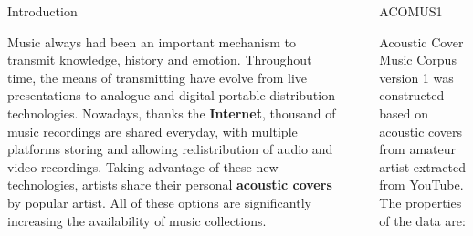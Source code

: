 \documentclass[final]{beamer}
\newlength{\sepwid}
\newlength{\onecolwid}
\newlength{\twocolwid}
\begin{document}
\begin{frame}[t]
\begin{columns}[t]
\begin{column}{\onecolwid}
\begin{block}{Introduction}

Music always had been an important mechanism to transmit knowledge, history and emotion. 
Throughout time, the means of transmitting have evolve from live presentations to analogue and digital portable distribution technologies.
Nowadays, thanks the \textbf{Internet}, thousand of music recordings are shared everyday, with multiple platforms storing and allowing redistribution of audio and video recordings.
Taking advantage of these new technologies, artists share their personal \textbf{acoustic covers} by popular artist.
All of these options are significantly increasing the availability of music collections.

\end{block}



\end{column} %

\begin{column}{\sepwid}\end{column} %

\begin{column}{\twocolwid} %

\begin{columns}[t,totalwidth=\twocolwid] %

\begin{column}{\onecolwid}\vspace{-.6in} %

\begin{alertblock}{ACOMUS1}

Acoustic Cover Music Corpus version 1 was constructed based on acoustic covers from amateur artist extracted from YouTube.
The properties of the data are:


\end{alertblock}
\end{column}
\end{columns}
\end{column}
\end{columns}
\end{frame}
\end{document}

